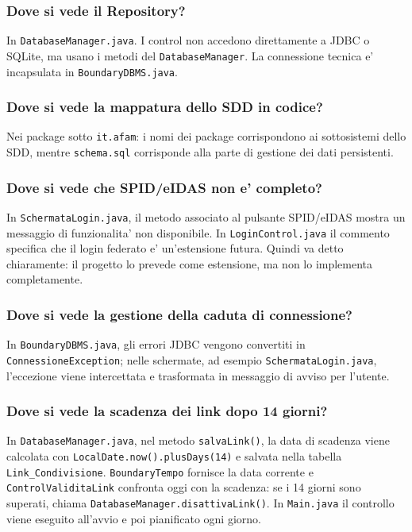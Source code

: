﻿\documentclass[11pt,a4paper]{article}
\begin{document}
\subsubsection*{Dove si vede il Repository?}

In \texttt{DatabaseManager.java}. I control non accedono direttamente a JDBC o SQLite,
ma usano i metodi del \texttt{DatabaseManager}. La connessione tecnica e' incapsulata in
\texttt{BoundaryDBMS.java}.

\subsubsection*{Dove si vede la mappatura dello SDD in codice?}

Nei package sotto \texttt{it.afam}: i nomi dei package corrispondono ai sottosistemi dello
SDD, mentre \texttt{schema.sql} corrisponde alla parte di gestione dei dati persistenti.

\subsubsection*{Dove si vede che SPID/eIDAS non e' completo?}

In \texttt{SchermataLogin.java}, il metodo associato al pulsante SPID/eIDAS mostra un
messaggio di funzionalita' non disponibile. In \texttt{LoginControl.java} il commento
specifica che il login federato e' un'estensione futura. Quindi va detto chiaramente:
il progetto lo prevede come estensione, ma non lo implementa completamente.

\subsubsection*{Dove si vede la gestione della caduta di connessione?}

In \texttt{BoundaryDBMS.java}, gli errori JDBC vengono convertiti in
\texttt{ConnessioneException}; nelle schermate, ad esempio \texttt{SchermataLogin.java},
l'eccezione viene intercettata e trasformata in messaggio di avviso per l'utente.

\subsubsection*{Dove si vede la scadenza dei link dopo 14 giorni?}

In \texttt{DatabaseManager.java}, nel metodo \texttt{salvaLink()}, la data di scadenza
viene calcolata con \texttt{LocalDate.now().plusDays(14)} e salvata nella tabella
\texttt{Link\_Condivisione}. \texttt{BoundaryTempo} fornisce la data corrente e
\texttt{ControlValiditaLink} confronta oggi con la scadenza: se i 14 giorni sono superati,
chiama \texttt{DatabaseManager.disattivaLink()}. In \texttt{Main.java} il controllo viene
eseguito all'avvio e poi pianificato ogni giorno.
\end{document}
